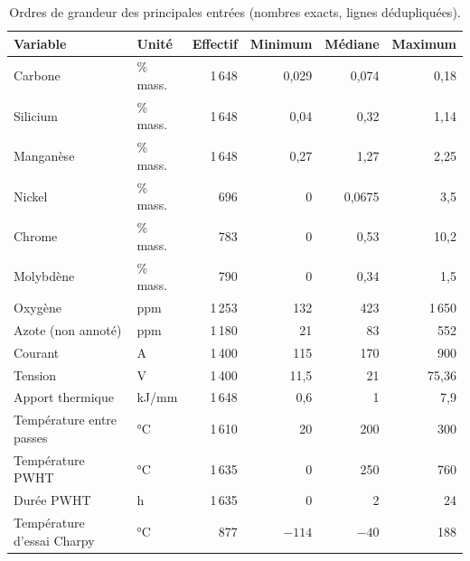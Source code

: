\begin{table}[htbp]
\centering
\small
\caption{Ordres de grandeur des principales entrées (nombres exacts, lignes dédupliquées).}
\label{tab:ordres}
\begin{tabular}{@{}llrrrr@{}}
\toprule
Variable & Unité & Effectif & Minimum & Médiane & Maximum \\
\midrule
Carbone                    & \% mass. & 1\,648 & 0,029 & 0,074 & 0,18 \\
Silicium                   & \% mass. & 1\,648 & 0,04  & 0,32  & 1,14 \\
Manganèse                  & \% mass. & 1\,648 & 0,27  & 1,27  & 2,25 \\
Nickel                     & \% mass. & 696   & 0     & 0,0675 & 3,5 \\
Chrome                     & \% mass. & 783   & 0     & 0,53  & 10,2 \\
Molybdène                  & \% mass. & 790   & 0     & 0,34  & 1,5 \\
Oxygène                    & ppm      & 1\,253 & 132  & 423   & 1\,650 \\
Azote (non annoté)         & ppm      & 1\,180 & 21   & 83    & 552 \\
Courant                    & A        & 1\,400 & 115  & 170   & 900 \\
Tension                    & V        & 1\,400 & 11,5 & 21    & 75,36 \\
Apport thermique           & kJ/mm    & 1\,648 & 0,6  & 1     & 7,9 \\
Température entre passes   & °C       & 1\,610 & 20   & 200   & 300 \\
Température PWHT           & °C       & 1\,635 & 0    & 250   & 760 \\
Durée PWHT                 & h        & 1\,635 & 0    & 2     & 24 \\
Température d'essai Charpy & °C       & 877   & $-114$ & $-40$ & 188 \\
\bottomrule
\end{tabular}
\end{table}


